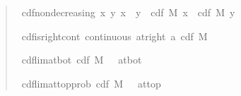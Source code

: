 \documentclass{svjour3}
\begin{document}
\begin{quote}
\begin{isabellebody}
\isamarkupfalse%
\ cdf{\isacharunderscore}nondecreasing{\isacharcolon}\ {\isachardoublequoteopen}{\isacharparenleft}{\isasymforall}x\ y{\isachardot}\ x\ {\isasymle}\ y\ {\isasymlongrightarrow}\ cdf\ M\ x\ {\isasymle}\ cdf\ M\ y{\isacharparenright}{\isachardoublequoteclose}\isanewline

\isamarkupfalse%
\ cdf{\isacharunderscore}is{\isacharunderscore}right{\isacharunderscore}cont{\isacharcolon}\ {\isachardoublequoteopen}continuous\ {\isacharparenleft}at{\isacharunderscore}right\ a{\isacharparenright}\ {\isacharparenleft}cdf\ M{\isacharparenright}{\isachardoublequoteclose}\isanewline

\isamarkupfalse%
\ cdf{\isacharunderscore}lim{\isacharunderscore}at{\isacharunderscore}bot{\isacharcolon}\ {\isachardoublequoteopen}{\isacharparenleft}cdf\ M\ {\isacharminus}{\isacharminus}{\isacharminus}{\isachargreater}\ {}{\isacharparenright}\ at{\isacharunderscore}bot{\isachardoublequoteclose}\isanewline

\isamarkupfalse%
\ cdf{\isacharunderscore}lim{\isacharunderscore}at{\isacharunderscore}top{\isacharunderscore}prob{\isacharcolon}\ {\isachardoublequoteopen}{\isacharparenleft}cdf\ M\ {\isacharminus}{\isacharminus}{\isacharminus}{\isachargreater}\ {}{\isacharparenright}\ at{\isacharunderscore}top{\isachardoublequoteclose}
\end{isabellebody}
\end{quote}
\end{document}
